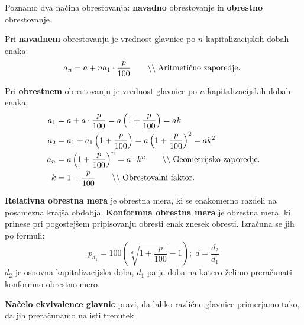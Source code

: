 \documentclass[a4paper,oneside,12pt,fleqn]{article}
\newcommand\krat\cdot
\newcommand{\comment}[1]{\ensuremath{\qquad\backslash\backslash\;}\textnormal{#1}}
\numberwithin{equation}{section}
\begin{document}
Poznamo dva načina obrestovanja: \textbf{navadno} obrestovanje in \textbf{obrestno} obrestovanje.

Pri \textbf{navadnem} obrestovanju je vrednost glavnice po $n$ kapitalizacijskih dobah enaka:
\[ a_n = a + na_1\krat \frac{p}{100} \comment{Aritmetično zaporedje. } \]

Pri \textbf{obrestnem} obrestovanju je vrednost glavnice po $n$ kapitalizacijskih dobah enaka:
\begin{align*}
  a_1 &= a + a\krat \frac{p}{100} = a\left(1 + \frac{p}{100}\right) = ak \\
  a_2 &= a_1 + a_1\left( 1+\frac{p}{100} \right) = a\left(1+\frac{p}{100}\right)^2 = ak^2  \\
  a_n &= a\left( 1+\frac{p}{100} \right)^n = a\krat k^n \comment{Geometrijsko zaporedje.} \\
  k &= 1+\frac{p}{100} \comment{Obrestovalni faktor.}
\end{align*}

\textbf{Relativna obrestna mera} je obrestna mera, ki se enakomerno razdeli na posamezna
krajša obdobja.
\textbf{Konformna obrestna mera} je obrestna mera, ki prinese pri pogostejšem pripisovanju
obresti enak znesek obresti. Izračuna se jih po formuli:
\[ p_{d_1} = 100\left( \sqrt[d]{1+\frac{p}{100}} - 1 \right) ; \; d = \frac{d_2}{d_1} \]
$d_2$ je osnovna kapitalizacijska doba, $d_1$ pa je doba na katero želimo preračunati
konformno obrestno mero.

\textbf{Načelo ekvivalence glavnic} pravi, da lahko različne glavnice primerjamo tako, da
jih preračunamo na isti trenutek.
\end{document}
